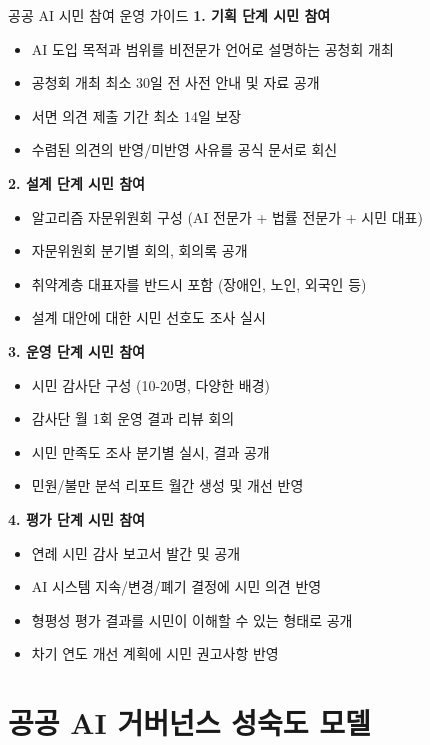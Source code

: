 \begin{practicaltool}{공공 AI 시민 참여 운영 가이드}
\textbf{1. 기획 단계 시민 참여}
\begin{itemize}
    \item AI 도입 목적과 범위를 비전문가 언어로 설명하는 공청회 개최
    \item 공청회 개최 최소 30일 전 사전 안내 및 자료 공개
    \item 서면 의견 제출 기간 최소 14일 보장
    \item 수렴된 의견의 반영/미반영 사유를 공식 문서로 회신
\end{itemize}

\textbf{2. 설계 단계 시민 참여}
\begin{itemize}
    \item 알고리즘 자문위원회 구성 (AI 전문가 + 법률 전문가 + 시민 대표)
    \item 자문위원회 분기별 회의, 회의록 공개
    \item 취약계층 대표자를 반드시 포함 (장애인, 노인, 외국인 등)
    \item 설계 대안에 대한 시민 선호도 조사 실시
\end{itemize}

\textbf{3. 운영 단계 시민 참여}
\begin{itemize}
    \item 시민 감사단 구성 (10-20명, 다양한 배경)
    \item 감사단 월 1회 운영 결과 리뷰 회의
    \item 시민 만족도 조사 분기별 실시, 결과 공개
    \item 민원/불만 분석 리포트 월간 생성 및 개선 반영
\end{itemize}

\textbf{4. 평가 단계 시민 참여}
\begin{itemize}
    \item 연례 시민 감사 보고서 발간 및 공개
    \item AI 시스템 지속/변경/폐기 결정에 시민 의견 반영
    \item 형평성 평가 결과를 시민이 이해할 수 있는 형태로 공개
    \item 차기 연도 개선 계획에 시민 권고사항 반영
\end{itemize}
\end{practicaltool}

\section{공공 AI 거버넌스 성숙도 모델}
\label{sec:18.7}

